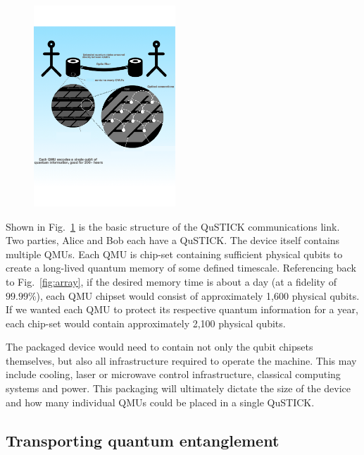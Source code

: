 \documentclass[twocolumn, aps, rmp, amsmath, amssymb, nofootinbib, superscriptaddress, longbibliography, floatfix, table-of-contents, eqsecnum]{revtex4-2}
\begin{document}
\begin{figure}[htbp!]
	\includegraphics[clip=true, width=0.475\textwidth]{qustick1}
	\caption{} \label{fig:qustick1}
\end{figure}

Shown in Fig.~\ref{fig:qustick1} is the basic structure of the QuSTICK communications link. Two parties, Alice and Bob each have a QuSTICK. The device itself contains multiple QMUs. Each QMU is chip-set containing sufficient physical qubits to create a long-lived quantum memory of some defined timescale. Referencing back to Fig.~\ref{fig:array}, if the desired memory time is about a day (at a fidelity of $99.99\%$), each QMU chipset would consist of approximately 1,600 physical qubits. If we wanted each QMU to protect its respective quantum information for a year, each chip-set would contain approximately 2,100 physical qubits. 

The packaged device would need to contain not only the qubit chipsets themselves, but also all infrastructure required to operate the machine. This may include cooling, laser or microwave control infrastructure, classical computing systems and power. This packaging will ultimately dictate the size of the device and how many individual QMUs could be placed in a single QuSTICK.

\subsection{Transporting quantum entanglement}
\end{document}
